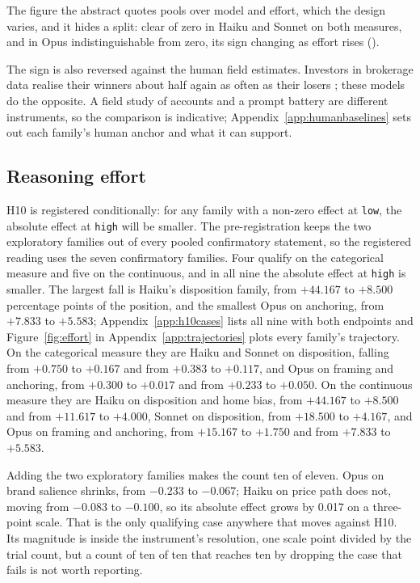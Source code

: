 \ifsubmission
The figure the abstract quotes pools over model and effort, which the design
varies, and it hides a split: clear of zero in Haiku and Sonnet on both
measures, and in Opus indistinguishable from zero, its sign changing as
effort rises ().
\else

\fi

\ifsubmission
The sign is also reversed against the human field estimates. Investors in
brokerage data realise their winners about half again as often as their
losers \citep{odean1998losses}; these models do the opposite. A field study
of accounts and a prompt battery are different instruments, so the comparison
is indicative; Appendix~\ref{app:humanbaselines} sets out each family's human
anchor and what it can support.
\else

\fi

\subsection{Reasoning effort}
H10 is registered conditionally: for any family with a non-zero effect at
\texttt{low}, the absolute effect at \texttt{high} will be smaller. The
pre-registration keeps the two exploratory families out of every pooled
confirmatory statement, so the registered reading uses the seven confirmatory
families. Four qualify on the categorical measure and five on the continuous,
and in all nine the absolute effect at \texttt{high} is smaller. \ifsubmission
The largest fall is Haiku's disposition family, from $+44.167$ to $+8.500$
percentage points of the position, and the smallest Opus on anchoring, from
$+7.833$ to $+5.583$; Appendix~\ref{app:h10cases} lists all nine with both
endpoints and Figure~\ref{fig:effort} in Appendix~\ref{app:trajectories}
plots every family's trajectory.
\else
On the
categorical measure they are Haiku and Sonnet on disposition, falling from
$+0.750$ to $+0.167$ and from $+0.383$ to $+0.117$, and Opus on framing and
anchoring, from $+0.300$ to $+0.017$ and from $+0.233$ to $+0.050$. On the
continuous measure they are Haiku on disposition and home bias, from
$+44.167$ to $+8.500$ and from $+11.617$ to $+4.000$, Sonnet on disposition,
from $+18.500$ to $+4.167$, and Opus on framing and anchoring, from $+15.167$
to $+1.750$ and from $+7.833$ to $+5.583$.
\fi

Adding the two exploratory families makes the count ten of eleven. Opus on
brand salience shrinks, from $-0.233$ to $-0.067$; Haiku on price path does
not, moving from $-0.083$ to $-0.100$, so its absolute effect grows by 0.017
on a three-point scale. That is the only qualifying case anywhere that moves
against H10. Its magnitude is inside the instrument's resolution, one scale
point divided by the trial count, but a count of ten of ten that reaches ten
by dropping the case that fails is not worth reporting.

